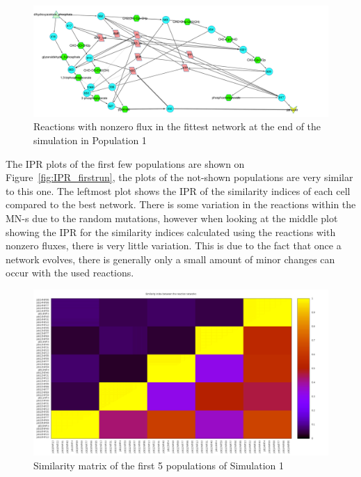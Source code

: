 \documentclass[10pt,a4paper]{article}
\begin{document}
\begin{figure}[htpb]
	\centering
	\includegraphics[width=1\linewidth]{trunk_glyc_final_job1.pdf}
	\caption{Reactions with nonzero flux in the fittest network at the end of the simulation in Population 1}
	\label{fig:trunk_glyc_final_job1}
\end{figure}



The IPR plots of the first few populations are shown on Figure~\ref{fig:IPR_firstrun}, the plots of the not-shown populations are very similar to this one. The leftmost plot shows the IPR of the similarity indices of each cell compared to the best network. There is some variation in the reactions within the MN-s due to the random mutations, however when looking at the middle plot showing the IPR for the similarity indices calculated using the reactions with nonzero fluxes, there is very little variation. This is due to the fact that once a network evolves, there is generally only a small amount of minor changes can occur with the used reactions. 

\begin{figure}[htpb]
	\centering
	\includegraphics[width=1\linewidth]{simmatrix_firstjob.png}
	\caption{Similarity matrix of the first 5 populations of Simulation 1}
	\label{fig:simmatrix_firstjob}
\end{figure}
\end{document}
